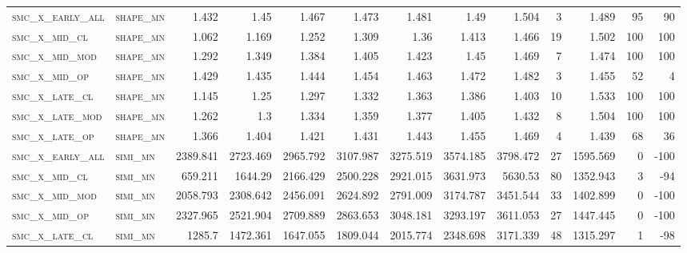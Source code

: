 \begin{landscape}
\begin{center}
\begin{footnotesize}
\begin{longtable}{llrrrrrrrr|rrr}
\textsc{smc\_x\_early\_all} & \textsc{shape\_mn }   & 1.432    & 1.45     & 1.467    & 1.473    & 1.481    & 1.49     & 1.504    & 3      & 1.489         & 95            & 90              \\
\textsc{smc\_x\_mid\_cl   } & \textsc{shape\_mn }   & 1.062    & 1.169    & 1.252    & 1.309    & 1.36     & 1.413    & 1.466    & 19     & 1.502         & 100           & 100             \\
\textsc{smc\_x\_mid\_mod  } & \textsc{shape\_mn }   & 1.292    & 1.349    & 1.384    & 1.405    & 1.423    & 1.45     & 1.469    & 7      & 1.474         & 100           & 100             \\
\textsc{smc\_x\_mid\_op   } & \textsc{shape\_mn }   & 1.429    & 1.435    & 1.444    & 1.454    & 1.463    & 1.472    & 1.482    & 3      & 1.455         & 52            & 4               \\
\textsc{smc\_x\_late\_cl  } & \textsc{shape\_mn }   & 1.145    & 1.25     & 1.297    & 1.332    & 1.363    & 1.386    & 1.403    & 10     & 1.533         & 100           & 100             \\
\textsc{smc\_x\_late\_mod } & \textsc{shape\_mn }   & 1.262    & 1.3      & 1.334    & 1.359    & 1.377    & 1.405    & 1.432    & 8      & 1.504         & 100           & 100             \\
\textsc{smc\_x\_late\_op  } & \textsc{shape\_mn }   & 1.366    & 1.404    & 1.421    & 1.431    & 1.443    & 1.455    & 1.469    & 4      & 1.439         & 68            & 36              \\
\textsc{smc\_x\_early\_all} & \textsc{simi\_mn  }   & 2389.841 & 2723.469 & 2965.792 & 3107.987 & 3275.519 & 3574.185 & 3798.472 & 27     & 1595.569      & 0             & -100            \\
\textsc{smc\_x\_mid\_cl   } & \textsc{simi\_mn  }   & 659.211  & 1644.29  & 2166.429 & 2500.228 & 2921.015 & 3631.973 & 5630.53  & 80     & 1352.943      & 3             & -94             \\
\textsc{smc\_x\_mid\_mod  } & \textsc{simi\_mn  }   & 2058.793 & 2308.642 & 2456.091 & 2624.892 & 2791.009 & 3174.787 & 3451.544 & 33     & 1402.899      & 0             & -100            \\
\textsc{smc\_x\_mid\_op   } & \textsc{simi\_mn  }   & 2327.965 & 2521.904 & 2709.889 & 2863.653 & 3048.181 & 3293.197 & 3611.053 & 27     & 1447.445      & 0             & -100            \\
\textsc{smc\_x\_late\_cl  } & \textsc{simi\_mn  }   & 1285.7   & 1472.361 & 1647.055 & 1809.044 & 2015.774 & 2348.698 & 3171.339 & 48     & 1315.297      & 1             & -98             \\

\end{longtable}
\end{footnotesize}
\end{center}
\end{landscape}
